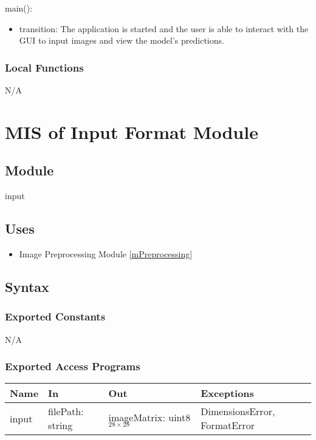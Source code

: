 \documentclass[12pt, titlepage]{article}
\begin{document}
\noindent main():
\begin{itemize}
\item transition: The application is started and the user is able to interact
with the GUI to input images and view the model's predictions.
\end{itemize}


\subsubsection{Local Functions}

N/A

\section{MIS of Input Format Module} \label{MInput}

\subsection{Module}

input

\subsection{Uses}

\begin{itemize}
  \item Image Preprocessing Module \ref{mPreprocessing}
\end{itemize}

\subsection{Syntax}

\subsubsection{Exported Constants}

N/A

\subsubsection{Exported Access Programs}

\begin{center}
\begin{tabular}{p{2cm} p{2cm} p{3cm} p{6cm}}
\hline
\textbf{Name} & \textbf{In} & \textbf{Out} & \textbf{Exceptions} \\
\hline
input & filePath: string & imageMatrix: uint8$_{28 \times 28}$ & DimensionsError, FormatError \\
\hline
\end{tabular}
\end{center}
\end{document}
